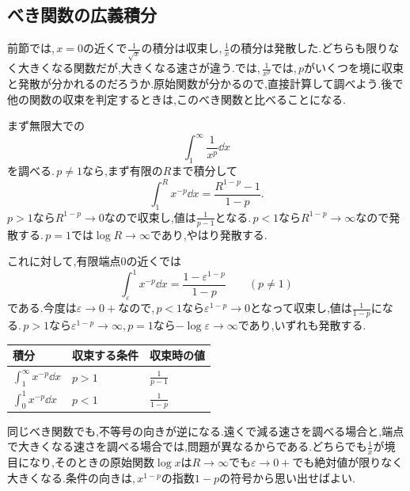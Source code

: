 \subsection{べき関数の広義積分}

前節では,\,$x=0$の近くで$\frac1{\sqrt{x}}$の積分は収束し,\,$\frac1x$の積分は発散した.どちらも限りなく大きくなる関数だが,大きくなる速さが違う.では,\,$\frac1{x^p}$では,\,$p$がいくつを境に収束と発散が分かれるのだろうか.原始関数が分かるので,直接計算して調べよう.後で他の関数の収束を判定するときは,このべき関数と比べることになる.

まず無限大での
\[
 \int_1^{\infty}\frac1{x^p}\dd x
\]
を調べる.\,$p\ne1$なら,まず有限の$R$まで積分して
\[
 \int_1^R x^{-p}\dd x=\frac{R^{1-p}-1}{1-p}.
\]
$p>1$なら$R^{1-p}\to0$なので収束し,値は$\frac1{p-1}$となる.\,$p<1$なら$R^{1-p}\to\infty$なので発散する.\,$p=1$では$\log R\to\infty$であり,やはり発散する.

これに対して,有限端点$0$の近くでは
\[
 \int_{\varepsilon}^{1}x^{-p}\dd x
 =\frac{1-\varepsilon^{1-p}}{1-p}\qquad(p\ne1)
\]
である.今度は$\varepsilon\to0+$なので,\,$p<1$なら$\varepsilon^{1-p}\to0$となって収束し,値は$\frac1{1-p}$になる.\,$p>1$なら$\varepsilon^{1-p}\to\infty$,\,$p=1$なら$-\log\varepsilon\to\infty$であり,いずれも発散する.

\begin{center}
\begin{tabular}{lll}
\toprule
積分 & 収束する条件 & 収束時の値\\
\midrule
$\int_1^{\infty}x^{-p}\dd x$ & $p>1$ & $\frac1{p-1}$\\[4pt]
$\int_0^1x^{-p}\dd x$ & $p<1$ & $\frac1{1-p}$\\
\bottomrule
\end{tabular}
\end{center}

同じべき関数でも,不等号の向きが逆になる.遠くで減る速さを調べる場合と,端点で大きくなる速さを調べる場合では,問題が異なるからである.どちらでも$\frac1x$が境目になり,そのときの原始関数$\log x$は$R\to\infty$でも$\varepsilon\to0+$でも絶対値が限りなく大きくなる.条件の向きは,\,$x^{1-p}$の指数$1-p$の符号から思い出せばよい.


